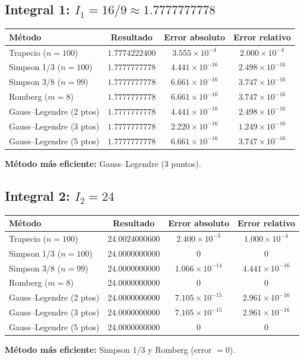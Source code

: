 \documentclass[12pt,a4paper]{article}
\begin{document}
\subsection{Integral 1: $I_1=16/9\approx 1.7777777778$}
\begin{center}
\begin{tabular}{l c c c}
\toprule
Método & Resultado & Error absoluto & Error relativo \\
\midrule
Trapecio ($n=100$)       & $1.7774222400$ & $3.555\times10^{-4}$ & $2.000\times10^{-4}$ \\
Simpson 1/3 ($n=100$)    & $1.7777777778$ & $4.441\times10^{-16}$ & $2.498\times10^{-16}$ \\
Simpson 3/8 ($n=99$)     & $1.7777777778$ & $6.661\times10^{-16}$ & $3.747\times10^{-16}$ \\
Romberg ($m=8$)          & $1.7777777778$ & $6.661\times10^{-16}$ & $3.747\times10^{-16}$ \\
Gauss--Legendre (2 ptos) & $1.7777777778$ & $4.441\times10^{-16}$ & $2.498\times10^{-16}$ \\
Gauss--Legendre (3 ptos) & $1.7777777778$ & $2.220\times10^{-16}$ & $1.249\times10^{-16}$ \\
Gauss--Legendre (5 ptos) & $1.7777777778$ & $6.661\times10^{-16}$ & $3.747\times10^{-16}$ \\
\bottomrule
\end{tabular}
\end{center}
\textbf{Método más eficiente:} Gauss--Legendre (3 puntos).

\subsection{Integral 2: $I_2=24$}
\begin{center}
\begin{tabular}{l c c c}
\toprule
Método & Resultado & Error absoluto & Error relativo \\
\midrule
Trapecio ($n=100$)       & $24.0024000600$ & $2.400\times10^{-3}$ & $1.000\times10^{-4}$ \\
Simpson 1/3 ($n=100$)    & $24.0000000000$ & $0$ & $0$ \\
Simpson 3/8 ($n=99$)     & $24.0000000000$ & $1.066\times10^{-14}$ & $4.441\times10^{-16}$ \\
Romberg ($m=8$)          & $24.0000000000$ & $0$ & $0$ \\
Gauss--Legendre (2 ptos) & $24.0000000000$ & $7.105\times10^{-15}$ & $2.961\times10^{-16}$ \\
Gauss--Legendre (3 ptos) & $24.0000000000$ & $7.105\times10^{-15}$ & $2.961\times10^{-16}$ \\
Gauss--Legendre (5 ptos) & $24.0000000000$ & $0$ & $0$ \\
\bottomrule
\end{tabular}
\end{center}
\textbf{Método más eficiente:} Simpson 1/3 y Romberg (error $=0$).
\end{document}
